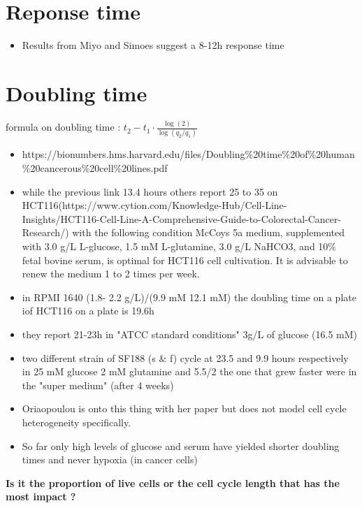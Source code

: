 \documentclass[11pt,a4paper]{article}
\begin{document}
\section{Reponse time}
\begin{itemize}
\item Results from Miyo and Simoes suggest a 8-12h response time \cite{Simoes2015}\cite{Miyo2016}
\end{itemize}

\section{Doubling time}
formula on doubling time : $t_2 - t_1 \cdot \frac{\log(2)}{\log(q_2/q_1)}$
\begin{itemize}
\item https://bionumbers.hms.harvard.edu/files/Doubling\%20time\%20of\%20human\%20cancerous\%20cell\%20lines.pdf

\item while the previous link 13.4 hours  others report 25 to 35 on HCT116(https://www.cytion.com/Knowledge-Hub/Cell-Line-Insights/HCT116-Cell-Line-A-Comprehensive-Guide-to-Colorectal-Cancer-Research/) with the following condition McCoys 5a medium, supplemented with 3.0 g/L L-glucose, 1.5 mM L-glutamine, 3.0 g/L NaHCO3, and 10\% fetal bovine serum, is optimal for HCT116 cell cultivation. It is advisable to renew the medium 1 to 2 times per week.

\item in RPMI 1640 (1.8- 2.2 g/L)/(9.9 mM 12.1 mM) the doubling time on a plate iof HCT116 on a plate is 19.6h \cite{Lei2013}

\item they report 21-23h in "ATCC standard conditions" 3g/L of glucose (16.5 mM) \cite{Ribas2003}

\item two different strain of SF188 (s \& f) cycle at 23.5 and 9.9 hours respectively in 25 mM glucose 2 mM glutamine and 5.5/2 the one that grew faster were in the "super medium" (after 4 weeks) \cite{Winer2014} 

\item Oriaopoulou is onto this thing with her paper but does not model cell cycle heterogeneity specifically. \cite{Oraiopoulou2017}

\item So far only high levels of glucose and serum have yielded shorter doubling times and never hypoxia (in cancer cells)
\end{itemize}
\textbf{Is it the proportion of live cells or the cell cycle length that has the most impact ?}
\end{document}
